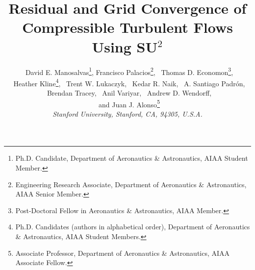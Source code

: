 
\title{Residual and Grid Convergence of Compressible Turbulent Flows Using SU$^2$}

 \author{
     \ David E. Manosalvas\thanks{Ph.D. Candidate, Department of Aeronautics \& Astronautics, AIAA Student Member.},
     Francisco Palacios\thanks{Engineering Research Associate, Department of Aeronautics \& Astronautics, AIAA Senior Member.},
     \ Thomas D. Economon\thanks{Post-Doctoral Fellow in Aeronautics \& Astronautics, AIAA Member.},\\
     \ Heather Kline\thanks{Ph.D. Candidates (authors in alphabetical order), Department of Aeronautics \& Astronautics, AIAA Student Members.},
     \ Trent W. Lukaczyk,
     \ Kedar R. Naik, 
     \ A. Santiago Padr\'on,\\
     \ Brendan Tracey,
     \ Anil Variyar,
     \ Andrew D. Wendorff,\\
   \ and Juan J. Alonso\thanks{Associate Professor, Department of Aeronautics \& Astronautics, AIAA Associate Fellow.}\\
  {\normalsize\itshape Stanford University, Stanford, CA, 94305, U.S.A.}
 }


